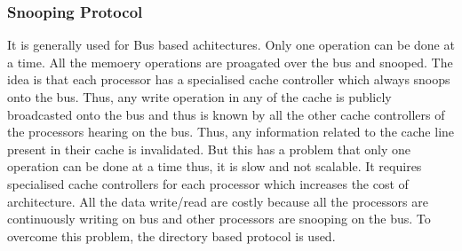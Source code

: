 \documentclass[12pt]{article}
\begin{document}
\subsubsection{Snooping Protocol}
It is generally used for Bus based achitectures. Only one operation 
can be done at a time. All the memoery operations are proagated over the bus and snooped.
The idea is that each processor has a specialised cache controller which always snoops onto the bus.
Thus, any write operation in any of the cache is publicly broadcasted onto the bus and thus is known by all the other cache controllers 
of the processors hearing on the bus. Thus, any information related to the cache line present in their cache is invalidated.
But this has a problem that only one operation can be done at a time thus, it is slow and not scalable. It requires specialised cache 
controllers for each processor which increases the cost of architecture. All the data write/read are costly because all the processors are 
continuously writing on bus and other processors are snooping on the bus.
To overcome this problem, the directory based protocol is used.
\end{document}
